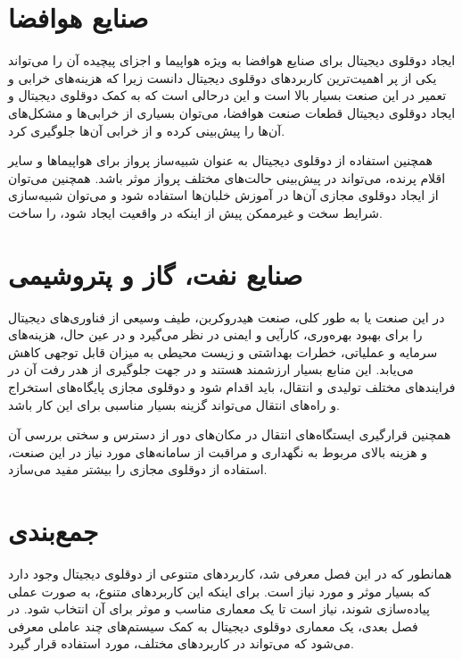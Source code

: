 \section{صنایع هوافضا}
ایجاد دوقلوی دیجیتال برای صنایع هوافضا به ویژه هواپیما و اجزای پیچیده آن را می‌تواند یکی از پر اهمیت‌ترین کاربرد‌های دوقلوی دیجیتال دانست زیرا که هزینه‌های خرابی و تعمیر در این صنعت بسیار بالا است و این درحالی است که به کمک دوقلوی دیجیتال و ایجاد دوقلوی دیجیتال قطعات صنعت هوافضا، می‌توان بسیاری از خرابی‌ها و مشکل‌های آن‌ها را پیش‌بینی کرده و از خرابی آن‌ها جلوگیری کرد.

همچنین استفاده از دوقلوی دیجیتال به عنوان شبیه‌ساز پرواز برای هواپیما‌ها و سایر اقلام پرنده، می‌تواند در پیش‌بینی حالت‌های مختلف پرواز موثر باشد. همچنین می‌توان از ایجاد دوقلوی مجازی آن‌ها در آموزش خلبان‌ها استفاده شود و می‌توان شبیه‌سازی شرایط سخت و غیرممکن پیش از اینکه در واقعیت ایجاد شود، را ساخت.

\section{صنایع نفت، گاز و پتروشیمی}
در این صنعت یا به طور کلی، صنعت هیدروکربن، طیف وسیعی از فناوری‌های دیجیتال را برای بهبود بهره‌وری، کارآیی و ایمنی در نظر می‌گیرد و در عین حال، هزینه‌های سرمایه و عملیاتی، خطرات بهداشتی و زیست محیطی به میزان قابل توجهی کاهش می‌یابد. این منابع بسیار ارزشمند هستند و در جهت جلوگیری از هدر رفت آن در فرایند‌های مختلف تولیدی و انتقال،‌ باید اقدام شود و دوقلوی مجازی پایگاه‌های استخراج و راه‌‌های انتقال می‌تواند گزینه بسیار مناسبی برای این کار باشد.

همچنین قرارگیری ایستگاه‌های انتقال در مکان‌های دور از دسترس و سختی بررسی آن و هزینه بالای مربوط به نگهداری و مراقبت از سامانه‌های مورد نیاز در این صنعت، استفاده از دوقلوی مجازی را بیشتر مفید می‌سازد.

\section{جمع‌بندی}
همانطور که در این فصل معرفی شد، کاربرد‌های متنوعی از دوقلوی دیجیتال وجود دارد که بسیار موثر و مورد نیاز است. برای اینکه این کاربرد‌های متنوع، به صورت عملی پیاده‌سازی شوند، نیاز است تا یک معماری مناسب و موثر برای آن انتخاب شود. در فصل بعدی، یک معماری دوقلوی دیجیتال به کمک سیستم‌های چند‌ عاملی معرفی می‌شود که می‌تواند در کاربرد‌های مختلف، مورد استفاده قرار گیرد.
